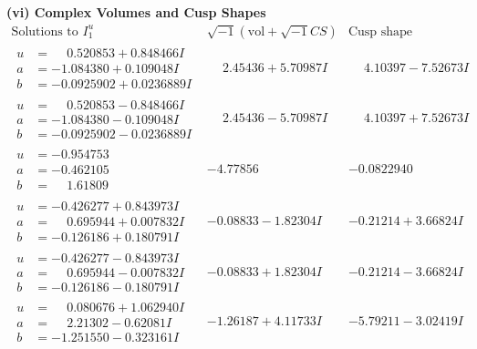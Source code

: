 \documentclass[1p]{elsarticle_modified}
\theoremstyle{definition}
\newcommand{\I}{\sqrt{-1}}
\begin{document}
\newpage\flushleft \textbf{(vi) Complex Volumes and Cusp Shapes}
$$\begin{array}{c|c|c}  
\text{Solutions to }I^u_{1}& \I (\text{vol} + \sqrt{-1}CS) & \text{Cusp shape}\\
 \hline 
\begin{aligned}
u &= \phantom{-}0.520853 + 0.848466 I \\
a &= -1.084380 + 0.109048 I \\
b &= -0.0925902 + 0.0236889 I\end{aligned}
 & \phantom{-}2.45436 + 5.70987 I & \phantom{-}4.10397 - 7.52673 I \\ \hline\begin{aligned}
u &= \phantom{-}0.520853 - 0.848466 I \\
a &= -1.084380 - 0.109048 I \\
b &= -0.0925902 - 0.0236889 I\end{aligned}
 & \phantom{-}2.45436 - 5.70987 I & \phantom{-}4.10397 + 7.52673 I \\ \hline\begin{aligned}
u &= -0.954753\phantom{ +0.000000I} \\
a &= -0.462105\phantom{ +0.000000I} \\
b &= \phantom{-}1.61809\phantom{ +0.000000I}\end{aligned}
 & -4.77856\phantom{ +0.000000I} & -0.0822940\phantom{ +0.000000I} \\ \hline\begin{aligned}
u &= -0.426277 + 0.843973 I \\
a &= \phantom{-}0.695944 + 0.007832 I \\
b &= -0.126186 + 0.180791 I\end{aligned}
 & -0.08833 - 1.82304 I & -0.21214 + 3.66824 I \\ \hline\begin{aligned}
u &= -0.426277 - 0.843973 I \\
a &= \phantom{-}0.695944 - 0.007832 I \\
b &= -0.126186 - 0.180791 I\end{aligned}
 & -0.08833 + 1.82304 I & -0.21214 - 3.66824 I \\ \hline\begin{aligned}
u &= \phantom{-}0.080676 + 1.062940 I \\
a &= \phantom{-}2.21302 - 0.62081 I \\
b &= -1.251550 - 0.323161 I\end{aligned}
 & -1.26187 + 4.11733 I & -5.79211 - 3.02419 I \\ \hline\begin{aligned}

\end{aligned}
\end{array}$$
\end{document}
